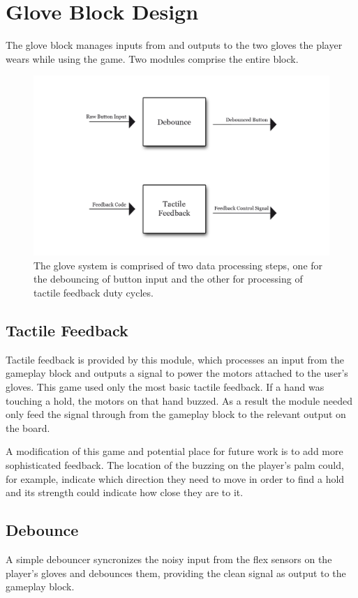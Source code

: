 \section{Glove Block Design}

The glove block manages inputs from and outputs to the two gloves the player
wears while using the game. Two modules comprise the entire block.

\begin{figure}
\centering
\includegraphics[scale=1]{img/glove.png}
\caption{The glove system is comprised of two data processing steps, one for the
debouncing of button input and the other for processing of tactile feedback duty
cycles.}
\label{fig:glove}
\end{figure}

\subsection{Tactile Feedback}

Tactile feedback is provided by this module, which processes an input from the
gameplay block and outputs a signal to power the motors attached to the user's
gloves. This game used only the most basic tactile feedback. If a hand was
touching a hold, the motors on that hand buzzed. As a result the module needed
only feed the signal through from the gameplay block to the relevant output on
the board. 

A modification of this game and potential place for future work is to add more
sophisticated feedback. The location of the buzzing on the player's palm could,
for example, indicate which direction they need to move in order to find a hold
and its strength could indicate how close they are to it.

\subsection{Debounce}

A simple debouncer syncronizes the noisy input from the flex sensors on the
player's gloves and debounces them, providing the clean signal as output to the
gameplay block.
